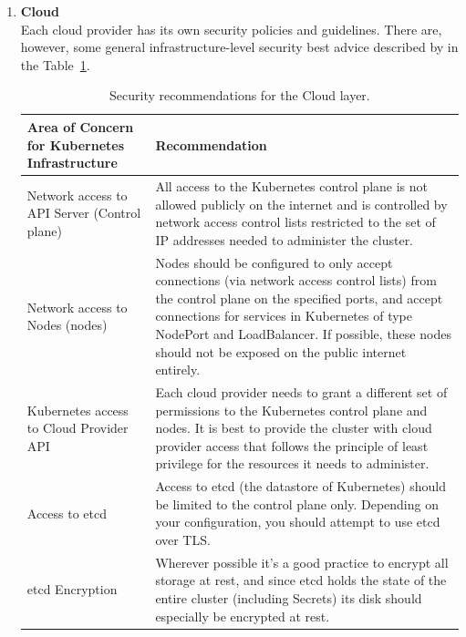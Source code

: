 \begin{enumerate}

\item \textbf{Cloud} \\
Each cloud provider has its own security policies and guidelines. There are, however, some general infrastructure-level security best advice described by in the Table~\ref{tab:cloud-security-recommendations}.

\begin{table}[H]
    \begin{center}
        \begin{tabular}{ | p{} | p{} | } 
         \hline
         \textbf{Area of Concern for Kubernetes Infrastructure} & \textbf{Recommendation} \\ 
         \hline
         Network access to API Server (Control plane) & All access to the Kubernetes control plane is not allowed publicly on the internet and is controlled by network access control lists restricted to the set of IP addresses needed to administer the cluster. \\ 
         \hline
         Network access to Nodes (nodes)  & Nodes should be configured to only accept connections (via network access control lists) from the control plane on the specified ports, and accept connections for services in Kubernetes of type NodePort and LoadBalancer. If possible, these nodes should not be exposed on the public internet entirely. \\ 
         \hline
         Kubernetes access to Cloud Provider API & Each cloud provider needs to grant a different set of permissions to the Kubernetes control plane and nodes. It is best to provide the cluster with cloud provider access that follows the principle of least privilege for the resources it needs to administer. \\
         \hline
         Access to etcd & Access to etcd (the datastore of Kubernetes) should be limited to the control plane only. Depending on your configuration, you should attempt to use etcd over TLS. \\
         \hline
         etcd Encryption & Wherever possible it's a good practice to encrypt all storage at rest, and since etcd holds the state of the entire cluster (including Secrets) its disk should especially be encrypted at rest. \\
         \hline
        \end{tabular}
    \end{center}
    \caption{Security recommendations for the Cloud layer.}
    \label{tab:cloud-security-recommendations}
\end{table}


\end{enumerate}
